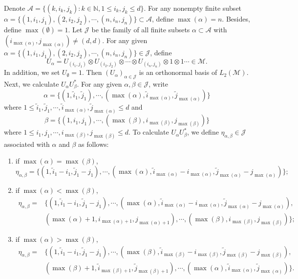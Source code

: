 \documentclass[oneside,english,a4wide]{amsart}
\numberwithin{equation}{section}
\numberwithin{figure}{section}
\theoremstyle{plain}
\theoremstyle{plain}
\theoremstyle{definition}
\theoremstyle{plain}
\theoremstyle{remark}
\theoremstyle{definition}
\theoremstyle{remark}
\theoremstyle{definition}
\newcommand{\8}{\infty}
\begin{document}
Denote $\mathscr{A}=\{(k,i_k,j_k): k\in\mathbb{N},1\le i_k,j_k\le d\}$. For any nonempty finite subset $\alpha=\{(1,i_{1},j_{1}),(2,i_{2},j_{2}),\cdots,(n,i_{n},j_{n})\}\subset \mathscr{A}$, define $\max(\alpha)=n$. Besides, define $\max(\emptyset)=1$. Let $\mathcal{J}$ be the family of all finite subsets $\alpha\subset\mathscr{A}$ with $(i_{\max(\alpha)},j_{\max(\alpha)})\neq (d,d)$. For any given $\alpha=\{(1,i_{1},j_{1}),(2,i_{2},j_{2}),\cdots,(n,i_{n},j_{n})\}\in\mathcal{J}$, define
\[U_\alpha=U_{(i_1,j_1)}\otimes U_{(i_2,j_2)}\otimes\cdots\otimes U_{(i_n,j_n)}\otimes 1\otimes 1 \cdots\in \mathscr{M} .\] 
In addition, we set $U_\emptyset=1$. Then $(U_\alpha)_{\alpha\in\mathcal{J}}$ is an orthonormal basis of $L_2(\mathscr{M})$. Next, we calculate  $U_\alpha U_\beta^*$. For any given $\alpha,\beta\in\mathcal{J}$, write 
\[\alpha=\{(1,\tilde{i}_1,\tilde{j}_1),\cdots,(\max(\alpha),\tilde{i}_{\max(\alpha)},\tilde{j}_{\max(\alpha)})\}\]
where $1\le \tilde{i}_1,\tilde{j}_1,\cdots,\tilde{i}_{\max(\alpha)},\tilde{j}_{\max(\alpha)}\le d$ and
\[\beta=\{(1,{i}_1,{j}_1),\cdots,(\max(\beta),{i}_{\max(\beta)},{j}_{\max(\beta)})\}\]
where $1\le {i}_1,{j}_1,\cdots,{i}_{\max(\beta)},{j}_{\max(\beta)}\le d$. To calculate $U_\alpha U_\beta^*$, we define $\eta_{\alpha,\beta}\in \mathcal{J}$ associated with $\alpha$ and $\beta$ as follows:
\begin{enumerate}
	\item if $\max(\alpha)=\max (\beta)$,
	\begin{equation}\label{5.1}
		\eta_{\alpha,\beta}=\{(1,\tilde{i}_1-i_1,\tilde{j}_1-j_1),\cdots,(\max(\alpha),\tilde{i}_{\max(\alpha)}-i_{\max(\alpha)},\tilde{j}_{\max(\alpha)}-j_{\max(\alpha)})\};
	\end{equation}
	\item if $\max(\alpha)<\max (\beta)$,
	\begin{equation}\label{5.2}
		\begin{aligned}
			\eta_{\alpha,\beta}={}&\{(1,\tilde{i}_1-i_1,\tilde{j}_1-j_1),\cdots,(\max(\alpha),\tilde{i}_{\max(\alpha)}-i_{\max(\alpha)},\tilde{j}_{\max(\alpha)}-j_{\max(\alpha)}),\\&(\max(\alpha)+1,i_{\max(\alpha)+1},j_{\max(\alpha)+1}),\cdots,(\max(\beta),i_{\max(\beta)},j_{\max(\beta)})\};
		\end{aligned}
	\end{equation}
	\item if $\max(\alpha)>\max (\beta)$,
	\begin{equation}\label{5.3}
		\begin{aligned}
			\eta_{\alpha,\beta}={}&\{(1,\tilde{i}_1-i_1,\tilde{j}_1-j_1),\cdots,(\max(\beta),\tilde{i}_{\max(\beta)}-i_{\max(\beta)},\tilde{j}_{\max(\beta)}-j_{\max(\beta)}),\\&(\max(\beta)+1,\tilde{i}_{\max(\beta)+1},\tilde{j}_{\max(\beta)+1}),\cdots,(\max(\alpha),\tilde{i}_{\max(\alpha)},\tilde{j}_{\max(\alpha)})\}.
		\end{aligned}
	\end{equation}
\end{enumerate}
\end{document}
